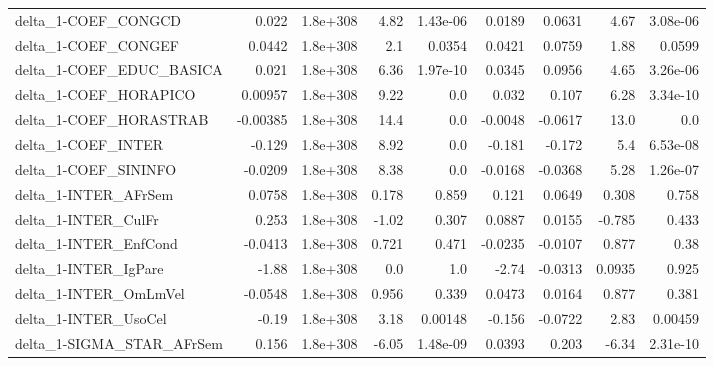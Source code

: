 \begin{tabular}{lrrrrrrrr}
delta\_1-COEF\_CONGCD                   &       0.022 &     1.8e+308 &    4.82 & 1.43e-06 &     0.0189 &      0.0631 &         4.67 &      3.08e-06 \\
delta\_1-COEF\_CONGEF                   &      0.0442 &     1.8e+308 &     2.1 &   0.0354 &     0.0421 &      0.0759 &         1.88 &        0.0599 \\
delta\_1-COEF\_EDUC\_BASICA              &       0.021 &     1.8e+308 &    6.36 & 1.97e-10 &     0.0345 &      0.0956 &         4.65 &      3.26e-06 \\
delta\_1-COEF\_HORAPICO                 &     0.00957 &     1.8e+308 &    9.22 &      0.0 &      0.032 &       0.107 &         6.28 &      3.34e-10 \\
delta\_1-COEF\_HORASTRAB                &    -0.00385 &     1.8e+308 &    14.4 &      0.0 &    -0.0048 &     -0.0617 &         13.0 &           0.0 \\
delta\_1-COEF\_INTER                    &      -0.129 &     1.8e+308 &    8.92 &      0.0 &     -0.181 &      -0.172 &          5.4 &      6.53e-08 \\
delta\_1-COEF\_SININFO                  &     -0.0209 &     1.8e+308 &    8.38 &      0.0 &    -0.0168 &     -0.0368 &         5.28 &      1.26e-07 \\
delta\_1-INTER\_AFrSem                  &      0.0758 &     1.8e+308 &   0.178 &    0.859 &      0.121 &      0.0649 &        0.308 &         0.758 \\
delta\_1-INTER\_CulFr                   &       0.253 &     1.8e+308 &   -1.02 &    0.307 &     0.0887 &      0.0155 &       -0.785 &         0.433 \\
delta\_1-INTER\_EnfCond                 &     -0.0413 &     1.8e+308 &   0.721 &    0.471 &    -0.0235 &     -0.0107 &        0.877 &          0.38 \\
delta\_1-INTER\_IgPare                  &       -1.88 &     1.8e+308 &     0.0 &      1.0 &      -2.74 &     -0.0313 &       0.0935 &         0.925 \\
delta\_1-INTER\_OmLmVel                 &     -0.0548 &     1.8e+308 &   0.956 &    0.339 &     0.0473 &      0.0164 &        0.877 &         0.381 \\
delta\_1-INTER\_UsoCel                  &       -0.19 &     1.8e+308 &    3.18 &  0.00148 &     -0.156 &     -0.0722 &         2.83 &       0.00459 \\
delta\_1-SIGMA\_STAR\_AFrSem             &       0.156 &     1.8e+308 &   -6.05 & 1.48e-09 &     0.0393 &       0.203 &        -6.34 &      2.31e-10 \\

\end{tabular}
